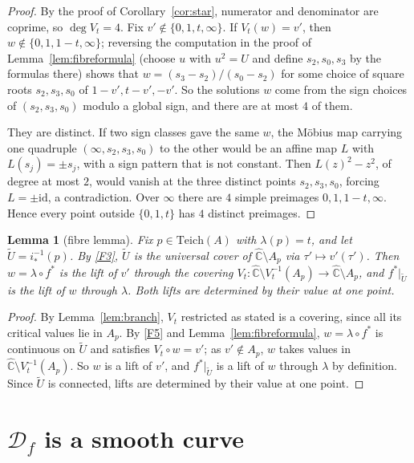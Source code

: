 \documentclass[11pt]{article}
\newtheorem{lemma}[proposition]{Lemma}
\theoremstyle{definition}
\newcommand{\Teich}{\mathrm{Teich}}
\newcommand{\Ch}{\hat{\mathbb C}}
\newcommand{\D}{\mathcal D}
\begin{document}
\begin{proof}
By the proof of Corollary~\ref{cor:star}, numerator and denominator are coprime, so $\deg V_t=4$. Fix $v'\notin\{0,1,t,\infty\}$. If $V_t(w)=v'$, then $w\notin\{0,1,1-t,\infty\}$; reversing the computation in the proof of Lemma~\ref{lem:fibreformula} (choose $u$ with $u^2=U$ and define $s_2,s_0,s_3$ by the formulas there) shows that $w=(s_3-s_2)/(s_0-s_2)$ for some choice of square roots $s_2,s_3,s_0$ of $1-v',t-v',-v'$. So the solutions $w$ come from the sign choices of $(s_2,s_3,s_0)$ modulo a global sign, and there are at most $4$ of them.

They are distinct. If two sign classes gave the same $w$, the M\"obius map carrying one quadruple $(\infty,s_2,s_3,s_0)$ to the other would be an affine map $L$ with $L(s_j)=\pm s_j$, with a sign pattern that is not constant. Then $L(z)^2-z^2$, of degree at most $2$, would vanish at the three distinct points $s_2,s_3,s_0$, forcing $L=\pm\mathrm{id}$, a contradiction. Over $\infty$ there are $4$ simple preimages $0,1,1-t,\infty$. Hence every point outside $\{0,1,t\}$ has $4$ distinct preimages.
\end{proof}

\begin{lemma}[fibre lemma]\label{lem:fibre}
Fix $p\in\Teich(A)$ with $\lambda(p)=t$, and let $\tilde U=i_*^{-1}(p)$. By \ref{F3}, $\tilde U$ is the universal cover of $\Ch\setminus A_p$ via $\tau'\mapsto v'(\tau')$. Then $w=\lambda\circ f^*$ is the lift of $v'$ through the covering $V_t\colon\Ch\setminus V_t^{-1}(A_p)\to\Ch\setminus A_p$, and $f^*|_{\tilde U}$ is the lift of $w$ through $\lambda$. Both lifts are determined by their value at one point.
\end{lemma}

\begin{proof}
By Lemma~\ref{lem:branch}, $V_t$ restricted as stated is a covering, since all its critical values lie in $A_p$. By \ref{F5} and Lemma~\ref{lem:fibreformula}, $w=\lambda\circ f^*$ is continuous on $\tilde U$ and satisfies $V_t\circ w=v'$; as $v'\notin A_p$, $w$ takes values in $\Ch\setminus V_t^{-1}(A_p)$. So $w$ is a lift of $v'$, and $f^*|_{\tilde U}$ is a lift of $w$ through $\lambda$ by definition. Since $\tilde U$ is connected, lifts are determined by their value at one point.
\end{proof}

\section{\texorpdfstring{$\D_f$}{D\_f} is a smooth curve}
\end{document}
